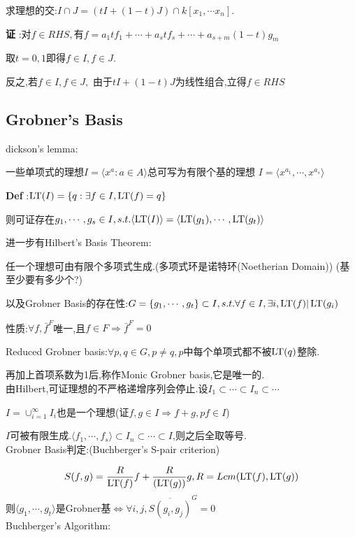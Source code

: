 求理想的交:$ I\cap J=(tI+(1-t)J)\cap k[x_1,\cdots x_n]$.

{\bf 证 }:对$ f\in RHS,$有$ f=a_1tf_1+\cdots+a_stf_s+\cdots+a_{s+m}(1-t)g_m$

取$ t=0,1$即得$ f\in I,f\in J$.

反之,若$ f\in I,f\in J,$ 由于$ tI+(1-t)J$为线性组合,立得$ f\in RHS$

\subsection{Grobner's Basis}
dickson's lemma:

一些单项式的理想$ I= \langle x^a : a\in A \rangle $总可写为有限个基的理想
$ I= \langle x^{a_1},\cdots,x^{a_s} \rangle $

{\bf Def }:$ \operatorname{\tiny{LT}}(I)=\{q: \exists f \in I,\operatorname{\tiny{LT}}(f)=q\}$

则可证存在$ g_1,\cdots,g_s\in I,s.t.  \langle \operatorname{\tiny{LT}}(I) \rangle = \langle \operatorname{\tiny{LT}}(g_1),\cdots,\operatorname{\tiny{LT}}(g_t) \rangle $

进一步有Hilbert's Basis Theorem:

任一个理想可由有限个多项式生成.(多项式环是诺特环(Noetherian Domain))   (基至少要有多少个?)

以及Grobner Basis的存在性:$ G=\{g_1,\cdots,g_t\}\subset I,s.t.\forall f\in I,\exists i, \operatorname{\tiny{LT}}(f)|\operatorname{\tiny{LT}}(g_i)$

性质:$ \forall f,\bar{f}^F$唯一,且$ f\in F\Rightarrow \bar{f}^F=0$

Reduced Grobner basis:$ \forall p,q\in G,p\ne q,p$中每个单项式都不被$ \operatorname{\tiny{LT}}(q)$整除.

再加上首项系数为1后,称作Monic Grobner basis,它是唯一的.
\\

由Hilbert,可证理想的不严格递增序列会停止.设$ I_1\subset\cdots\subset I_n\subset\cdots$

$ I=\cup_{i=1}^{\infty}I_i$也是一个理想(证$ f,g\in I \Rightarrow f+g,pf\in I$)

$ I$可被有限生成.$  \langle f_1,\cdots,f_s \rangle \subset I_n\subset\cdots \subset I$,则之后全取等号.
\\

Grobner Basis判定:(Buchberger's S-pair criterion)

\[  S(f,g)=\dfrac{R}{\operatorname{\tiny{LT}}(f)}f+\dfrac{R}{(\operatorname{\tiny{LT}}(g))}g,R=Lcm(\operatorname{\tiny{LT}} (f),\operatorname{\tiny{LT}} (g))\]
则$  \langle g_1,\cdots,g_t \rangle $是Grobner基$ \Leftrightarrow \forall i,j,\overline{S(g_i,g_j)}^G=0$
\\

Buchberger's Algorithm:


